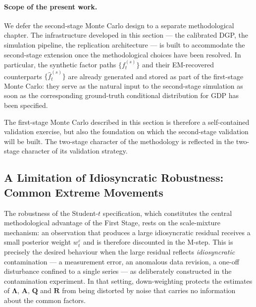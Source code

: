 \documentclass[11pt, a4paper, oneside]{article}
\newcommand{\mL}{\boldsymbol{\Lambda}}
\begin{document}
\paragraph{Scope of the present work.}
We defer the second-stage Monte Carlo design to a separate
methodological chapter. The infrastructure developed in this
section — the calibrated DGP, the simulation pipeline, the
replication architecture — is built to accommodate the second-stage
extension once the methodological choices have been resolved. In
particular, the synthetic factor paths $\{f_t^{(s)}\}$ and their
EM-recovered counterparts $\{\hat{f}_t^{(s)}\}$ are already
generated and stored as part of the first-stage Monte Carlo: they
serve as the natural input to the second-stage simulation as soon
as the corresponding ground-truth conditional distribution for GDP
has been specified.

The first-stage Monte Carlo described in this section is therefore
a self-contained validation exercise, but also the foundation on
which the second-stage validation will be built. The two-stage
character of the methodology is reflected in the two-stage
character of its validation strategy.

\newpage
\subsection{A Limitation of Idiosyncratic Robustness: Common
Extreme Movements}
\label{subsec:robustness-limitation}

The robustness of the Student-$t$ specification, which constitutes
the central methodological advantage of the First Stage, rests on
the scale-mixture mechanism: an observation that produces a large
idiosyncratic residual receives a small posterior weight
$w^\varepsilon_t$ and is therefore discounted in the M-step. This
is precisely the desired behaviour when the large residual reflects
\emph{idiosyncratic} contamination --- a measurement error, an
anomalous data revision, a one-off disturbance confined to a single
series --- as deliberately constructed in the contamination
experiment. In that setting,
down-weighting protects the estimates of $\mL$,
$\mathbf{A}$, $\mathbf{Q}$ and $\mathbf{R}$ from being distorted by
noise that carries no information about the common factors.
\end{document}
